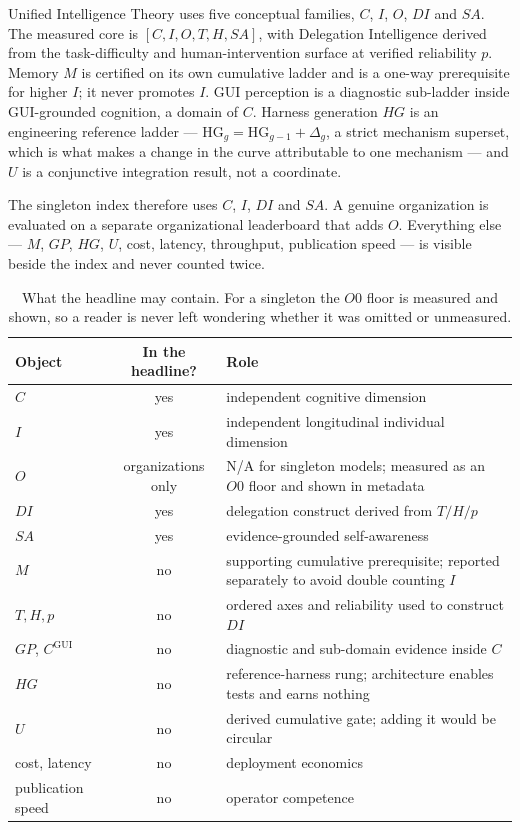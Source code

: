 Unified Intelligence Theory uses five conceptual families, $C$, $I$, $O$, $DI$ and $SA$. The measured core is $[C, I, O, T, H, SA]$, with Delegation Intelligence derived from the task-difficulty and human-intervention surface at verified reliability $p$. Memory $M$ is certified on its own cumulative ladder and is a one-way prerequisite for higher $I$; it never promotes $I$. GUI perception is a diagnostic sub-ladder inside GUI-grounded cognition, a domain of $C$. Harness generation $HG$ is an engineering reference ladder --- $\mathrm{HG}_g = \mathrm{HG}_{g-1} + \Delta_g$, a strict mechanism superset, which is what makes a change in the curve attributable to one mechanism --- and $U$ is a conjunctive integration result, not a coordinate.

The singleton index therefore uses $C$, $I$, $DI$ and $SA$. A genuine organization is evaluated on a separate organizational leaderboard that adds $O$. Everything else --- $M$, $GP$, $HG$, $U$, cost, latency, throughput, publication speed --- is visible beside the index and never counted twice.

\begin{table}[!htbp]
\centering\small
\begin{tabularx}{\textwidth}{@{}l c Y@{}}
\toprule
Object & In the headline? & Role \\
\midrule
$C$ & yes & independent cognitive dimension \\
$I$ & yes & independent longitudinal individual dimension \\
$O$ & organizations only & N/A for singleton models; measured as an $O0$ floor and shown in metadata \\
$DI$ & yes & delegation construct derived from $T/H/p$ \\
$SA$ & yes & evidence-grounded self-awareness \\
$M$ & no & supporting cumulative prerequisite; reported separately to avoid double counting $I$ \\
$T, H, p$ & no & ordered axes and reliability used to construct $DI$ \\
$GP$, $C^{\mathrm{GUI}}$ & no & diagnostic and sub-domain evidence inside $C$ \\
$HG$ & no & reference-harness rung; architecture enables tests and earns nothing \\
$U$ & no & derived cumulative gate; adding it would be circular \\
cost, latency & no & deployment economics \\
publication speed & no & operator competence \\
\bottomrule
\end{tabularx}
\caption{What the headline may contain. For a singleton the $O0$ floor is measured and shown, so a reader is never left wondering whether it was omitted or unmeasured.}
\label{tab:objects}
\end{table}


